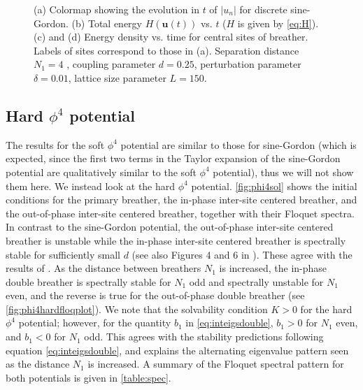 \documentclass[12pt,reqno]{amsart}
\newcommand{\uvec}{\mathbf{u}}
\theoremstyle{definition}
\begin{document}
\begin{figure}
\begin{center}
\begin{subfigure}{0.45\linewidth}
		\label{fig:timestepSGpplongd}
	\end{subfigure}
	\end{center}
	\caption{(a) Colormap showing the evolution in $t$ of $|u_n|$ for discrete sine-Gordon. (b) Total energy $H(\uvec(t))$ vs. $t$ ($H$ is given by \cref{eq:H}). (c) and (d) Energy density vs. time for central sites of breather. Labels of sites correspond to those in (a). Separation distance $N_1 = 4$
	, coupling parameter $d=0.25$, perturbation parameter $\delta = 0.01$, lattice size parameter $L=150$.}
	\label{fig:timestepSGpplong}
\end{figure}

\subsection{Hard \texorpdfstring{$\phi^4$}{phi-4} potential}

The results for the soft $\phi^4$ potential are similar to those for sine-Gordon (which is expected, since the first two terms in the Taylor expansion of the sine-Gordon potential are qualitatively similar to the soft $\phi^4$ potential), thus we will not show them here. We instead look at the hard $\phi^4$ potential. \cref{fig:phi4sol} shows the initial conditions for the primary breather, the in-phase inter-site centered breather, and the out-of-phase inter-site centered breather, together with their Floquet spectra. In contrast to the sine-Gordon potential, the out-of-phase inter-site centered breather is unstable while the in-phase inter-site centered breather is spectrally stable for sufficiently small $d$ (see also Figures 4 and 6 in \cite{cuevas-maraver2016}). These agree with the results of \cites{Archilla2003,Koukouloyannis2009}. As the distance between breathers $N_1$ is increased, the in-phase double breather is spectrally stable for $N_1$ odd and spectrally unstable for $N_1$ even, and the reverse is true for the out-of-phase double breather (see \cref{fig:phi4hardfloqplot}). We note that the solvability condition $K > 0$ for the hard $\phi^4$ potential; however, for the quantity $b_1$ in \cref{eq:inteigsdouble}, $b_1 > 0$ for $N_1$ even, and $b_1 < 0$ for $N_1$ odd. This agrees with the stability predictions following equation \cref{eq:inteigsdouble}, and explains the alternating eigenvalue pattern seen as the distance $N_1$ is increased. A summary of the Floquet spectral pattern for both potentials is given in \cref{table:spec}.
\end{document}
